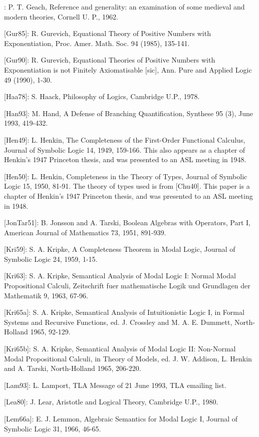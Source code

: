 \begin{spec}
[Gea62]: P. T. Geach, Reference and generality: an examination of
some medieval and modern theories, Cornell U. P., 1962.

[Gur85]: R. Gurevich, Equational Theory of Positive Numbers with
Exponentiation, Proc. Amer. Math. Soc. 94 (1985), 135-141.

[Gur90]: R. Gurevich, Equational Theories of Positive Numbers with
Exponentiation is not Finitely Axiomatisable [sic], Ann.  Pure and
Applied Logic 49 (1990), 1-30.

[Haa78]: S. Haack, Philosophy of Logics, Cambridge U.P., 1978.

[Han93]: M. Hand, A Defense of Branching Quantification, Synthese
95 (3), June 1993, 419-432.

[Hen49]: L. Henkin, The Completeness of the First-Order Functional
Calculus, Journal of Symbolic Logic 14, 1949, 159-166. This also
appears as a chapter of Henkin's 1947 Princeton thesis, and was
presented to an ASL meeting in 1948.

[Hen50]: L. Henkin, Completeness in the Theory of Types, Journal of
Symbolic Logic 15, 1950, 81-91. The theory of types used is from
[Chu40]. This paper is a chapter of Henkin's 1947 Princeton thesis,
and was presented to an ASL meeting in 1948.

[JonTar51]: B. Jonsson and A. Tarski, Boolean Algebras with
Operators, Part I, American Journal of Mathematics 73, 1951,
891-939.

[Kri59]: S. A. Kripke, A Completeness Theorem in Modal Logic,
Journal of Symbolic Logic 24, 1959, 1-15.

[Kri63]: S. A. Kripke, Semantical Analysis of Modal Logic I: Normal
Modal Propositional Calculi, Zeitschrift fuer mathematische Logik
und Grundlagen der Mathematik 9, 1963, 67-96.

[Kri65a]: S. A. Kripke, Semantical Analysis of Intuitionistic Logic
I, in Formal Systems and Recursive Functions, ed.  J. Crossley and
M. A. E.  Dummett, North-Holland 1965, 92-129.

[Kri65b]: S. A. Kripke, Semantical Analysis of Modal Logic II:
Non-Normal Modal Propositional Calculi, in Theory of Models, ed.  J.
W.  Addison, L. Henkin and A. Tarski, North-Holland 1965, 206-220.

[Lam93]: L. Lamport, TLA Message of 21 June 1993, TLA emailing list.

[Lea80]: J. Lear, Aristotle and Logical Theory, Cambridge U.P.,
1980.

[Lem66a]: E. J. Lemmon, Algebraic Semantics for Modal Logic I,
Journal of Symbolic Logic 31, 1966, 46-65.


\end{spec}

